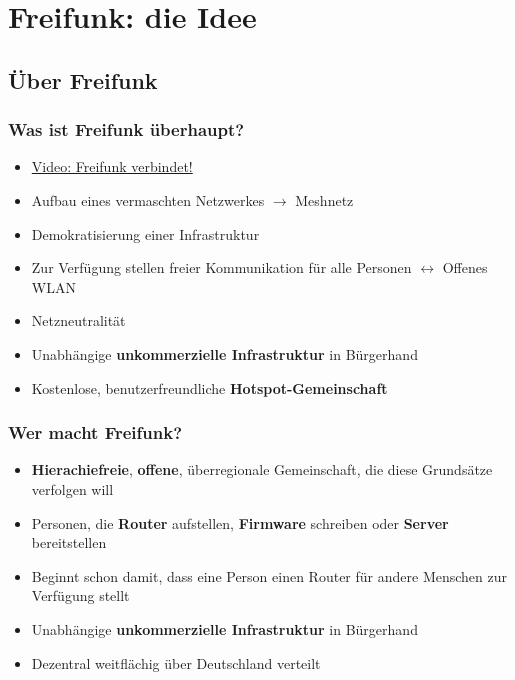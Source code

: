 \section{Freifunk: die Idee}
\subsection{Über Freifunk}

\begin{frame}
\frametitle{Was ist Freifunk überhaupt?}
	\begin{itemize}
		\item \href{https://vimeo.com/64814620}{Video: Freifunk verbindet!}
		\item Aufbau eines vermaschten Netzwerkes $\rightarrow$ Meshnetz
		\item Demokratisierung einer Infrastruktur
		\item Zur Verfügung stellen freier Kommunikation für alle Personen $\leftrightarrow$ Offenes WLAN
		\item Netzneutralität
		\item Unabhängige \textbf{unkommerzielle Infrastruktur} in Bürgerhand
		\item Kostenlose, benutzerfreundliche \textbf{Hotspot-Gemeinschaft}
	\end{itemize}
\end{frame}

\begin{frame}
\frametitle{Wer macht Freifunk?}
	\begin{itemize}
		\item \textbf{Hierachiefreie}, \textbf{offene}, überregionale Gemeinschaft, die diese Grundsätze verfolgen will
		\item Personen, die \textbf{Router} aufstellen, \textbf{Firmware} schreiben oder \textbf{Server} bereitstellen
		\item Beginnt schon damit, dass eine Person einen Router für andere Menschen zur Verfügung stellt
		\item Unabhängige \textbf{unkommerzielle Infrastruktur} in Bürgerhand
		\item Dezentral weitflächig über Deutschland verteilt
	\end{itemize}
\end{frame}

